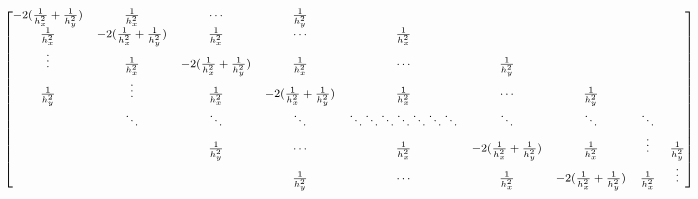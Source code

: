 \documentclass{article} %
\begin{document}
\begin{align}
    \footnotesize
    \begin{bmatrix}
        -2(\frac{1}{h_x^2}+\frac{1}{h_y^2}) & \frac{1}{h_x^2}                     & \cdots                              & \frac{1}{h_y^2}                                                                                                                                                                                                                                   \\
        \frac{1}{h_x^2}                     & -2(\frac{1}{h_x^2}+\frac{1}{h_y^2}) & \frac{1}{h_x^2}                     & \cdots                              & \frac{1}{h_x^2}                                                                                                                                                                                             \\
        \vdots                              & \frac{1}{h_x^2}                     & -2(\frac{1}{h_x^2}+\frac{1}{h_y^2}) & \frac{1}{h_x^2}                     & \cdots                                              & \frac{1}{h_y^2}                                                                                                                                       \\
        \frac{1}{h_y^2}                     & \vdots                              & \frac{1}{h_x^2}                     & -2(\frac{1}{h_x^2}+\frac{1}{h_y^2}) & \frac{1}{h_x^2}                                     & \cdots                              & \frac{1}{h_y^2}                                                                                                 \\
                                            & \ddots                              & \ddots                              & \ddots                              & \ddots  \ddots \ddots \ddots  \ddots \ddots  \ddots & \ddots                              & \ddots                              & \ddots                                                                    \\
                                            &                                     & \frac{1}{h_y^2}                     & \cdots                              & \frac{1}{h_x^2}                                     & -2(\frac{1}{h_x^2}+\frac{1}{h_y^2}) & \frac{1}{h_x^2}                     & \vdots                              & \frac{1}{h_y^2}                     \\
                                            &                                     &                                     & \frac{1}{h_y^2}                     & \cdots                                              & \frac{1}{h_x^2}                     & -2(\frac{1}{h_x^2}+\frac{1}{h_y^2}) & \frac{1}{h_x^2}                     & \vdots                              \\

\end{bmatrix}
\end{align}
\end{document}
